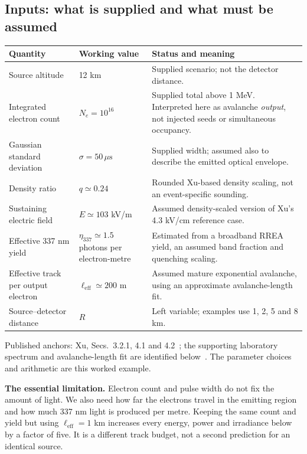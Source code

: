 \documentclass[11pt,a4paper]{article}
\newcommand{\source}[1]{{\small\color{muted}#1}\par}
\begin{document}
\subsection{Inputs: what is supplied and what must be assumed}
\begin{center}
\small
\begin{tabularx}{\textwidth}{@{}P{37mm}P{34mm}Y@{}}
\toprule
\textbf{Quantity} & \textbf{Working value} & \textbf{Status and meaning}\\
\midrule
Source altitude & 12 km & Supplied scenario; not the detector distance.\\
Integrated electron count & $N_e=10^{16}$ & Supplied total above 1 MeV. Interpreted here as avalanche \emph{output}, not injected seeds or simultaneous occupancy.\\
Gaussian standard deviation & $\sigma=50\,\mu\mathrm{s}$ & Supplied width; assumed also to describe the emitted optical envelope.\\
Density ratio & $q\simeq0.24$ & Rounded Xu-based density scaling, not an event-specific sounding.\\
Sustaining electric field & $E\simeq103$ kV/m & Assumed density-scaled version of Xu's 4.3 kV/cm reference case.\\
Effective 337 nm yield & $\eta_{337}\simeq1.5$ photons per electron-metre & Estimated from a broadband RREA yield, an assumed band fraction and quenching scaling.\\
Effective track per output electron & $\ell_{\mathrm{eff}}\simeq200$ m & Assumed mature exponential avalanche, using an approximate avalanche-length fit.\\
Source--detector distance & $R$ & Left variable; examples use 1, 2, 5 and 8 km.\\
\bottomrule
\end{tabularx}
\end{center}
\source{Published anchors: Xu, Secs.~3.2.1, 4.1 and 4.2~\cite{Xu2015}; the supporting laboratory spectrum and avalanche-length fit are identified below~\cite{AIRFLY2007,Cramer2016}. The parameter choices and arithmetic are this worked example.}

\textbf{The essential limitation.} Electron count and pulse width do not fix the amount of light. We also need how far the electrons travel in the emitting region and how much 337 nm light is produced per metre. Keeping the same count and yield but using $\ell_{\mathrm{eff}}=1$ km increases every energy, power and irradiance below by a factor of five. It is a different track budget, not a second prediction for an identical source.
\end{document}
